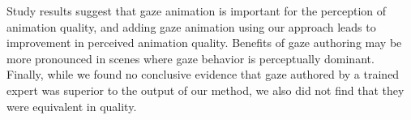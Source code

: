 Study results suggest that gaze animation is important for the perception of animation quality, and adding gaze animation using our approach leads to improvement in perceived animation quality. Benefits of gaze authoring may be more pronounced in scenes where gaze behavior is perceptually dominant. Finally, while we found no conclusive evidence that gaze authored by a trained expert was superior to the output of our method, we also did not find that they were equivalent in quality.

